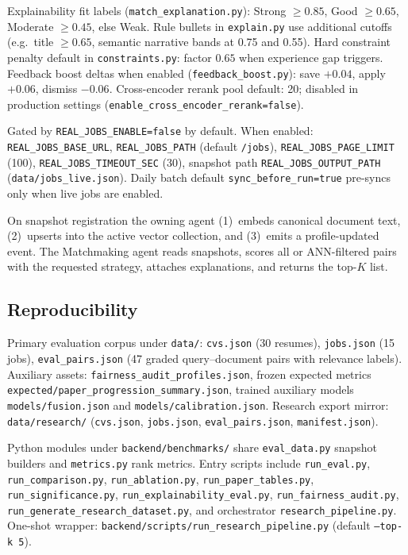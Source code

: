 Explainability fit labels (\texttt{match\_explanation.py}): Strong $\geq 0.85$, Good $\geq 0.65$, Moderate $\geq 0.45$, else Weak.
Rule bullets in \texttt{explain.py} use additional cutoffs (e.g.\ title $\geq 0.65$, semantic narrative bands at 0.75 and 0.55).
Hard constraint penalty default in \texttt{constraints.py}: factor $0.65$ when experience gap triggers.
Feedback boost deltas when enabled (\texttt{feedback\_boost.py}): save $+0.04$, apply $+0.06$, dismiss $-0.06$.
Cross-encoder rerank pool default: 20; disabled in production settings (\texttt{enable\_cross\_encoder\_rerank=false}).

Gated by \texttt{REAL\_JOBS\_ENABLE=false} by default.
When enabled: \texttt{REAL\_JOBS\_BASE\_URL}, \texttt{REAL\_JOBS\_PATH} (default \texttt{/jobs}), \texttt{REAL\_JOBS\_PAGE\_LIMIT} (100), \texttt{REAL\_JOBS\_TIMEOUT\_SEC} (30), snapshot path \texttt{REAL\_JOBS\_OUTPUT\_PATH} (\texttt{data/jobs\_live.json}).
Daily batch default \texttt{sync\_before\_run=true} pre-syncs only when live jobs are enabled.

On snapshot registration the owning agent (1)~embeds canonical document text, (2)~upserts into the active vector collection, and (3)~emits a profile-updated event.
The Matchmaking agent reads snapshots, scores all or ANN-filtered pairs with the requested strategy, attaches explanations, and returns the top-$K$ list.

\subsection{Reproducibility}\label{sec:4-benchmarks}

Primary evaluation corpus under \texttt{data/}: \texttt{cvs.json} (30 resumes), \texttt{jobs.json} (15 jobs), \texttt{eval\_pairs.json} (47 graded query--document pairs with relevance labels).
Auxiliary assets: \texttt{fairness\_audit\_profiles.json}, frozen expected metrics \texttt{expected/paper\_progression\_summary.json}, trained auxiliary models \texttt{models/fusion.json} and \texttt{models/calibration.json}.
Research export mirror: \texttt{data/research/} (\texttt{cvs.json}, \texttt{jobs.json}, \texttt{eval\_pairs.json}, \texttt{manifest.json}).

Python modules under \texttt{backend/benchmarks/} share \texttt{eval\_data.py} snapshot builders and \texttt{metrics.py} rank metrics.
Entry scripts include \texttt{run\_eval.py}, \texttt{run\_comparison.py}, \texttt{run\_ablation.py}, \texttt{run\_paper\_tables.py}, \texttt{run\_significance.py}, \texttt{run\_explainability\_eval.py}, \texttt{run\_fairness\_audit.py}, \texttt{run\_generate\_research\_dataset.py}, and orchestrator \texttt{research\_pipeline.py}.
One-shot wrapper: \texttt{backend/scripts/run\_research\_pipeline.py} (default \texttt{--top-k 5}).

